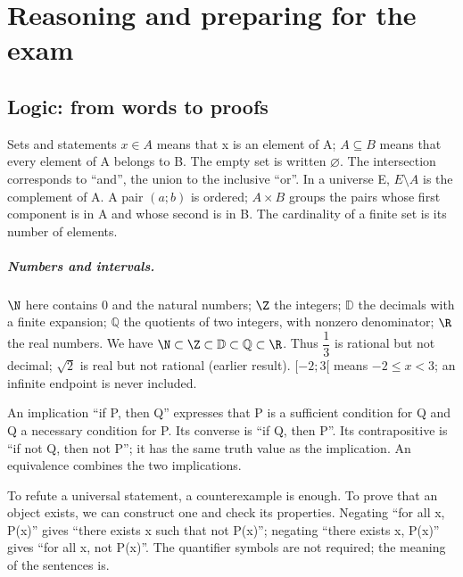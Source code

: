 \chapter{Reasoning and preparing for the exam}\label{TRANS}
\section{Logic: from words to proofs}\label{LOGIQUE}
\begin{repere}{Sets and statements}
$x\in A$ means that x is an element of A; $A\subseteq B$ means that every element of A belongs to B. The empty set is written $\varnothing$. The intersection corresponds to ``and'', the union to the inclusive ``or''. In a universe E, $E\setminus A$ is the complement of A. A pair $(a;b)$ is ordered; $A\times B$ groups the pairs whose first component is in A and whose second is in B. The cardinality of a finite set is its number of elements.
\end{repere}

\paragraph{Numbers and intervals.} $\N$ here contains 0 and the natural numbers; $\Z$ the integers; $\mathbb D$ the decimals with a finite expansion; $\mathbb Q$ the quotients of two integers, with nonzero denominator; $\R$ the real numbers. We have $\N\subset\Z\subset\mathbb D\subset\mathbb Q\subset\R$. Thus $\dfrac{1}{3}$ is rational but not decimal; $\sqrt2$ is real but not rational (earlier result). $[-2;3[$ means $-2\leq x<3$; an infinite endpoint is never included.

An implication ``if P, then Q'' expresses that P is a sufficient condition for Q and Q a necessary condition for P. Its converse is ``if Q, then P''. Its contrapositive is ``if not Q, then not P''; it has the same truth value as the implication. An equivalence combines the two implications.

To refute a universal statement, a counterexample is enough. To prove that an object exists, we can construct one and check its properties. Negating ``for all x, P(x)'' gives ``there exists x such that not P(x)''; negating ``there exists x, P(x)'' gives ``for all x, not P(x)''. The quantifier symbols are not required; the meaning of the sentences is.

